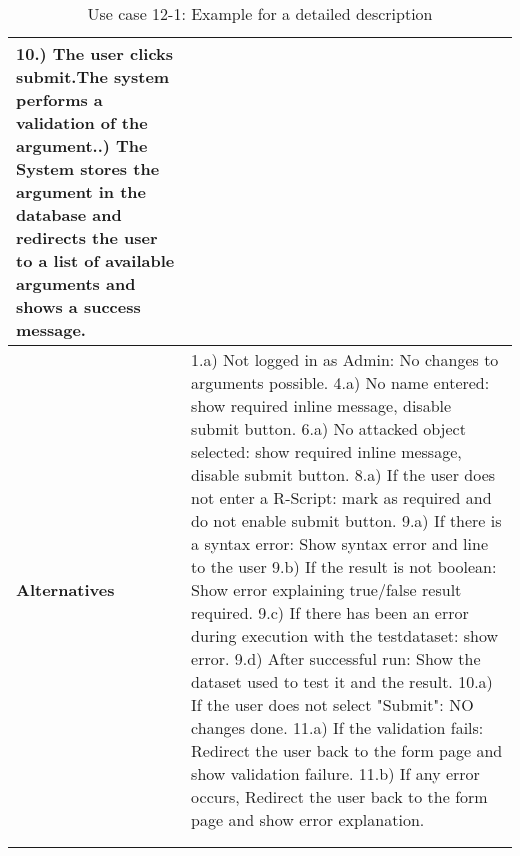 {\begin{longtable}{|p{2cm} p{11cm}|}
				10.) The user clicks submit.The system performs a validation of the argument.\newline
				11.) The System stores the argument in the database and redirects the user to a list of available arguments and shows a success message.
		\\
		\hline
			\textbf{Alternatives} & 
							1.a) Not logged in as Admin: No changes to arguments possible.
				\newline	4.a) No name entered: show required inline message, disable submit button.
				\newline	6.a) No attacked object selected: show required inline message, disable submit button.
				\newline	8.a) If the user does not enter a R-Script: mark as required and do not enable submit button.
				\newline	9.a) If there is a syntax error: Show syntax error and line to the user
				\newline	9.b) If the result is not boolean: Show error explaining true/false result required.
				\newline	9.c) If there has been an error during execution with the testdataset: show error.
				\newline	9.d) After successful run: Show the dataset used to test it and the result.
				\newline	10.a) If the user does not select "Submit": NO changes done.
				\newline	11.a) If the validation fails: Redirect the user back to the form page and show validation failure.
				\newline	11.b) If any error occurs,  Redirect the user back to the form page and show error explanation.
							\\
		\hline

	\label{uc:12-1}\\
	\caption{Use case 12-1: Example for a detailed description}
\end{longtable}
}